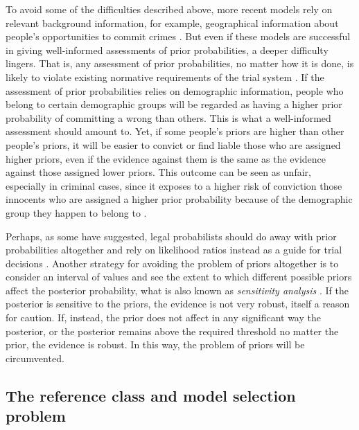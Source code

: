 \documentclass{article}
\begin{document}
 To avoid some of the difficulties described above, more recent models rely on relevant background information, for example, geographical information  about people's opportunities to commit crimes \citep{fenton2019OpportunityPriorProofbased}. 
 But even if these models are successful in giving well-informed assessments of prior probabilities, a deeper difficulty lingers. That is, any assessment of prior probabilities, no matter how it is done, is likely to violate existing normative requirements of the trial system \citep{dahlman2017, engel2012NeglectBaseRate,schweizer2013LawDoesnSay}. If the assessment of prior probabilities relies on demographic information, people who belong to certain demographic groups will be regarded as having a higher prior probability of committing a wrong than others. This is what a well-informed assessment should amount to. Yet, if 
 some people's priors are higher than other people's priors, 
 it will be easier to convict or find liable those who are assigned higher priors, even if the evidence against them is the same as the evidence against those assigned lower priors.
 This outcome can be seen as unfair, especially in criminal cases, since it exposes to a higher risk of conviction those innocents who are assigned a higher prior probability  because of the demographic group they happen to belong to \citep{DiBelloONeil2020}. 
 
 Perhaps, as some have suggested, legal probabilists should do away with prior probabilities altogether and rely on likelihood ratios instead as a guide for trial decisions  \citep{sullivan2016LikelihoodStoryTheory}. Another strategy for avoiding the problem of priors altogether is to consider an interval of values and see the extent to which different possible priors affect the posterior probability, what is also known as \textit{sensitivity analysis} \citep{Finkelstein1970A}. If the posterior is sensitive to the priors, the evidence is not very robust, itself a reason for caution.  If, instead, the prior does not affect in any significant way the posterior, or the posterior remains above the required threshold no matter the prior, the evidence is robust. In this way, the problem of priors will be circumvented. 





\subsection{The reference class and model selection problem}
\end{document}
